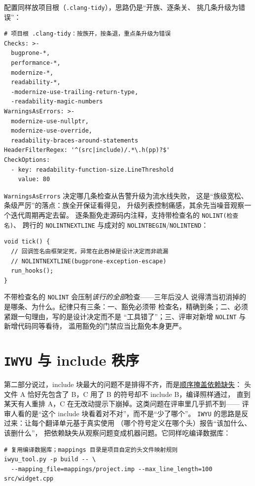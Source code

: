 \documentclass[12pt,a4paper,fontset=fandol]{ctexbook}
\newcommand{\Tp}[1]{\texttt{#1}}
\newcommand{\Bk}{\discretionary{}{}{}}
\begin{document}
配置同样放项目根（\Tp{.clang-tidy}），思路仍是``开族、逐条关、
挑几条升级为错误''：

\begin{lstlisting}[style=yamlstyle]
# 项目根 .clang-tidy：按族开，按条退，重点条升级为错误
Checks: >-
  bugprone-*,
  performance-*,
  modernize-*,
  readability-*,
  -modernize-use-trailing-return-type,
  -readability-magic-numbers
WarningsAsErrors: >-
  modernize-use-nullptr,
  modernize-use-override,
  readability-braces-around-statements
HeaderFilterRegex: '^(src|include)/.*\.h(pp)?$'
CheckOptions:
  - key: readability-function-size.LineThreshold
    value: 80
\end{lstlisting}

\Tp{WarningsAsErrors} 决定哪几条检查从告警升级为流水线失败，
这是``族级宽松、条级严厉''的落点：族全开保证看得见，
升级列表控制痛感，其余先当噪音观察一个迭代周期再定去留。
逐条豁免走源码内注释，支持带检查名的 \Tp{NOLINT(检查名)}、
跨行的 \Tp{NOLINTNEXTLINE} 与成对的 \Tp{NOLINTBEGIN}/{\Bk}\Tp{NOLINTEND}：

\begin{lstlisting}[style=cppstyle]
void tick() {
  // 回调签名由框架定死，异常在此吞掉是设计决定而非疏漏
  // NOLINTNEXTLINE(bugprone-exception-escape)
  run_hooks();
}
\end{lstlisting}

\begin{warning}[title={裸 NOLINT 当消音}]
不带检查名的 \Tp{NOLINT} 会压制\emph{该行的全部}检查——三年后没人
说得清当初消掉的是哪条、为什么。纪律只有三条：一、豁免必须带
检查名，精确到条；二、必须紧跟一句理由，写的是设计决定而不是
``工具错了''；三、评审对新增 \Tp{NOLINT} 与新增代码同等看待，
滥用豁免的门禁应当比豁免本身更严。
\end{warning}

\section{\Tp{IWYU} 与 include 秩序}
\label{sec:ch13-iwyu}

第二部分说过，include 块最大的问题不是排得不齐，而是\underline{顺序掩盖依赖缺失}：
头文件 A 恰好先包含了 B，C 用了 B 的符号却不 include B，编译照样通过，
直到某天有人重排 A，C 在无改动提示下崩掉。这类问题在评审里几乎抓不到——
评审人看的是``这个 include 块看着对不对''，而不是``少了哪个''。
\Tp{IWYU} 的思路是反过来：让每个翻译单元基于真实使用
（哪个符号定义在哪个头）报告``该加什么、该删什么''，
把依赖缺失从观察问题变成机器问题。它同样吃编译数据库：

\begin{lstlisting}[style=shellstyle]
# 复用编译数据库；mappings 目录是项目自定的头文件映射规则
iwyu_tool.py -p build -- \
  --mapping_file=mappings/project.imp --max_line_length=100 src/widget.cpp
\end{lstlisting}
\end{document}
